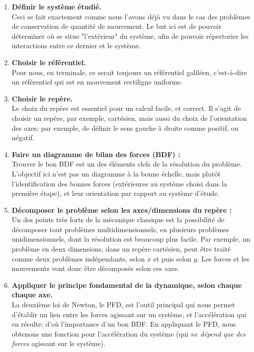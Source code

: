 \documentclass[11pt,a4paper]{article}
\begin{document}
\begin{mdframed}[backgroundcolor=blue!5]

\begin{enumerate}
    \item \textbf{Définir le système étudié. } \\
    Ceci se fait exactement comme nous l'avons déjà vu dans le cas des problèmes de conservation de quantité de mouvement. Le but ici est de pouvoir déterminer où se situe "l'extérieur" du système, afin de pouvoir répertorier les interactions entre ce dernier et le système. 
    \item \textbf{Choisir le référentiel.} \\
    Pour nous, en terminale, ce serait toujours un référentiel galiléen, c'est-à-dire un référentiel qui est en mouvement rectiligne uniforme. 
    \item \textbf{Choisir le repère. }\\
    Le choix du repère est essentiel pour un calcul facile, et correct. Il s'agit de choisir un repère, par exemple, cartésien, mais aussi du choix de l'orientation des axes; par exemple, de définir le sens gauche à droite comme positif, ou négatif.   
    \item \textbf{Faire un diagramme de bilan des forces (BDF) : }\\
    Trouver le bon BDF est un des éléments clefs de la résolution du problème. L'objectif ici n'est pas un diagramme à la bonne échelle, mais plutôt l'identification des bonnes forces (extérieures au système choisi dans la première étape), et leur orientation par rapport au système d'étude. 
    \item \textbf{Décomposer le problème selon les axes/dimensions du repère : } \\
    Un des points très forts de la mécanique classique est la possibilité de décomposer tout problèmes multidimensionnels, en plusieurs problèmes unidimensionnels, dont la résolution est beaucoup plus facile. Par exemple, un problème en deux dimensions, dans un repère cartésien, peut être traité comme deux problèmes indépendants, selon $x$ et puis selon $y$. Les forces et les mouvements vont donc être décomposés selon ces axes. 
    \item \textbf{Appliquer le principe fondamental de la dynamique, selon chaque chaque axe. }\\
    La deuxième loi de Newton, le PFD, est l'outil principal qui nous permet d'établir un lien entre les forces agissant sur un système, et l'accélération qui en résulte; d'où l'importance d'un bon BDF. En appliquant le PFD, nous obtenons une fonction pour l'accélération du système (qui \textit{ne dépend que des forces} agissant sur le système). 

\end{enumerate}
\end{mdframed}
\end{document}
